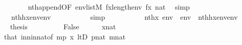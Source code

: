 \begin{isabellebody}
\ \ \ \ \ \ \isamarkupfalse%
\ nth{\isacharunderscore}{\kern0pt}append{\isacharbrackleft}{\kern0pt}OF\ {\isacartoucheopen}env{\isacharprime}{\kern0pt}{\isasymin}list{\isacharparenleft}{\kern0pt}M{\isacharparenright}{\kern0pt}{\isacartoucheclose}{\isacharbrackright}{\kern0pt}\ {\isacartoucheopen}f{\isacharbackquote}{\kern0pt}x{\isacharless}{\kern0pt}length{\isacharparenleft}{\kern0pt}env{\isacharprime}{\kern0pt}{\isacharparenright}{\kern0pt}{\isacartoucheclose}\ {\isacartoucheopen}f{\isacharbackquote}{\kern0pt}x\ {\isasymin}nat{\isacartoucheclose}\ \isamarkupfalse%
\ simp\isanewline
\ \ \ \ \isamarkupfalse%
\isanewline
\ \ \ \ \isamarkupfalse%
\ {\isachardoublequoteopen}{\isachardot}{\kern0pt}{\isachardot}{\kern0pt}{\isachardot}{\kern0pt}\ {\isacharequal}{\kern0pt}\ nth{\isacharparenleft}{\kern0pt}{\isacharquery}{\kern0pt}h{\isacharbackquote}{\kern0pt}x{\isacharcomma}{\kern0pt}env{\isacharprime}{\kern0pt}{\isacharat}{\kern0pt}env{}{\isacharparenright}{\kern0pt}{\isachardoublequoteclose}\isanewline
\ \ \ \ \ \ \isamarkupfalse%
\ {}\ \isamarkupfalse%
\ simp\isanewline
\ \ \ \ \isamarkupfalse%
\isanewline
\ \ \ \ \isamarkupfalse%
\ {\isachardoublequoteopen}nth{\isacharparenleft}{\kern0pt}x{\isacharcomma}{\kern0pt}\ env\ {\isacharat}{\kern0pt}\ env{}{\isacharparenright}{\kern0pt}\ {\isacharequal}{\kern0pt}\ nth{\isacharparenleft}{\kern0pt}{\isacharquery}{\kern0pt}h{\isacharbackquote}{\kern0pt}x{\isacharcomma}{\kern0pt}env{\isacharprime}{\kern0pt}{\isacharat}{\kern0pt}env{}{\isacharparenright}{\kern0pt}{\isachardoublequoteclose}\ \isacommand{{\isachardot}{\kern0pt}}\isamarkupfalse%
\isanewline
\ \ \ \ \isamarkupfalse%
\ \isamarkupfalse%
\ {\isacharquery}{\kern0pt}thesis\ \isacommand{{\isachardot}{\kern0pt}}\isamarkupfalse%
\isanewline
\ \ \isamarkupfalse%
\isanewline
\ \ \ \ \isamarkupfalse%
\ False\isanewline
\ \ \ \ \isamarkupfalse%
\ {\isachardoublequoteopen}x{\isasymin}nat{\isachardoublequoteclose}\isanewline
\ \ \ \ \ \ \isamarkupfalse%
\ that\ in{\isacharunderscore}{\kern0pt}n{\isacharunderscore}{\kern0pt}in{\isacharunderscore}{\kern0pt}nat{\isacharbrackleft}{\kern0pt}of\ {\isachardoublequoteopen}m{\isacharhash}{\kern0pt}{\isacharplus}{\kern0pt}p{\isachardoublequoteclose}\ x{\isacharbrackright}{\kern0pt}\ ltD\ {\isacartoucheopen}p{\isasymin}nat{\isacartoucheclose}\ {\isacartoucheopen}m{\isasymin}nat{\isacartoucheclose}\ \isamarkupfalse%

\end{isabellebody}
